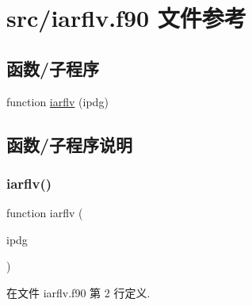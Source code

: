 \hypertarget{iarflv_8f90}{}\section{src/iarflv.f90 文件参考}
\label{iarflv_8f90}
\subsection*{函数/子程序}
\begin{DoxyCompactItemize}
\item 
function \mbox{\hyperlink{iarflv_8f90_a0654604bfba61e389866be8741d783f7}{iarflv}} (ipdg)
\end{DoxyCompactItemize}


\subsection{函数/子程序说明}
\mbox{\label{iarflv_8f90_a0654604bfba61e389866be8741d783f7}} 
\subsubsection{\texorpdfstring{iarflv()}{iarflv()}}
{\footnotesize\ttfamily function iarflv (\begin{DoxyParamCaption}\item[{}]{ipdg }\end{DoxyParamCaption})}



在文件 iarflv.\+f90 第 2 行定义.

